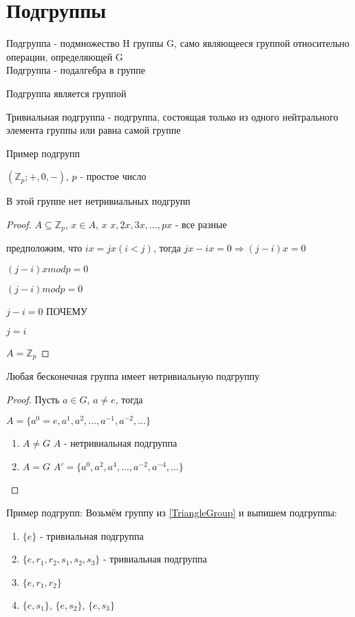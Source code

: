 \documentclass[../main/document.tex]{subfiles}
\begin{document}
\section{Подгруппы}
\begin{dfn}
Подгруппа - подмножество H группы G, само являющееся группой относительно операции, определяющей G\\
Подгруппа - подалгебра в группе
\end{dfn}
\begin{cnsq}
Подгруппа является группой
\end{cnsq}
\begin{dfn}
Тривиальная подгруппа - подгруппа, состоящая только из одного нейтрального элемента группы или равна самой группе
\end{dfn}
\begin{exm}
Пример подгрупп
\end{exm}
\begin{exm}
$(\mathbb{Z}_p;+,0,-)$, $p$ - простое число

В этой группе нет нетривиальных подгрупп
\begin{proof}
$A\subseteq \mathbb{Z}_p$, $x\in A$, $x$
$x,2x,3x,...,px$ - все разные

предположим, что $ix=jx (i<j)$, тогда $jx-ix=0\Rightarrow (j-i)x=0$

$(j-i)xmodp=0$

$(j-i)modp=0$

$j-i=0$ ПОЧЕМУ

$j=i$

$A=\mathbb{Z}_p$

\end{proof}
\end{exm}
\begin{thm}
Любая бесконечная группа имеет нетривиальную подгруппу
\begin{proof}
Пусть $a\in G$, $a\neq e$, тогда

$A=\{a^0=e, a^1,a^2,...,a^{-1},a^{-2},...\}$
\begin{enumerate}
\item $A\neq G$ $A$ - нетривиальная подгруппа
\item $A=G$ $A'=\{a^0,a^2,a^4,...,a^{-2},a^{-4},...\}$
\end{enumerate}
\end{proof}
\end{thm}
\begin{exm}
Пример подгрупп:
Возьмём группу из \ref{TriangleGroup} и выпишем подгруппы:
\begin{enumerate}
\item $\{e\}$ - тривиальная подгруппа
\item $\{e,r_1,r_2,s_1,s_2,s_3\}$ - тривиальная подгруппа
\item $\{e,r_1,r_2\}$
\item $\{e,s_1\}$, $\{e,s_2\}$, $\{e,s_3\}$
\end{enumerate}
\end{exm}
\end{document}
